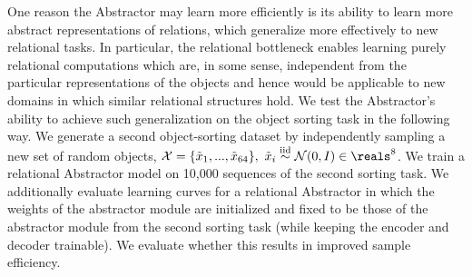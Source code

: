One reason the Abstractor may learn more efficiently is its ability to learn more abstract representations of relations, which generalize more effectively
 to new relational tasks. In particular, the relational bottleneck enables learning purely relational computations which are, in some sense, independent from the particular representations of the objects and hence would be applicable to new domains in which similar relational structures hold.
We test the Abstractor's ability to achieve such generalization on the object sorting task in the following way. We
generate a second object-sorting dataset by independently sampling a new set of random objects, $\mathcal{X} = \{ \tilde{x}_1 , ..., \tilde{x}_{64} \}, \ \tilde{x}_i \overset{\mathrm{iid}}{\sim} \mathcal{N}(0, I) \in \reals^8$. We train a relational Abstractor model on 10,000 sequences of the second sorting task. We additionally evaluate learning curves for a relational Abstractor in which the weights of the abstractor module are initialized and fixed to be those of the abstractor module from the second sorting task (while keeping the encoder and decoder trainable).
We evaluate whether this results in improved sample efficiency.

